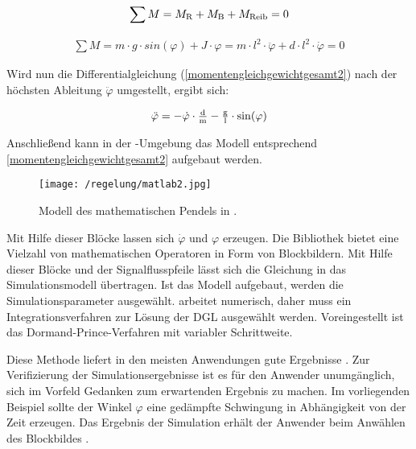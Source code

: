 \begin{align}
	\sum M = M_\i{R} + M_\i{B} + M_\i{Reib} = 0
	\label{momentengleichgewichtgesamt} 
\end{align}

\begin{align}
	\sum M = m \cdot g \cdot \si{sin}(\varphi) + J \cdot \varphi = m \cdot l^{2} \cdot \ddot\varphi + d \cdot l^{2} \cdot \dot\varphi = 0
	\label{momentengleichgewichtgesamt2} 
\end{align}

Wird nun die Differentialgleichung (\ref{momentengleichgewichtgesamt2}) nach der höchsten Ableitung $\ddot\varphi$ umgestellt, ergibt sich:

\begin{align}
	\ddot\varphi = -\dot\varphi \cdot \tfrac{\i{d}}{\i{m}} - \tfrac{\i{g}}{\i{l}} \cdot \si{sin}(\varphi)
	\label{diffgleichung} 
\end{align}


Anschließend kann in der -Umgebung das Modell entsprechend \ref{momentengleichgewichtgesamt2} aufgebaut werden.

\begin{figure}[h]
	\centering
	\texttt{[image: /regelung/matlab2.jpg]}
	\label{fig:matlab2}
	\caption{Modell des mathematischen Pendels in  .}
\end{figure}

Mit Hilfe dieser Blöcke lassen sich  $\dot{\varphi}$ und $\varphi$ erzeugen.
Die  Bibliothek bietet eine Vielzahl von mathematischen Operatoren in Form von Blockbildern.
Mit Hilfe dieser Blöcke und der Signalflusspfeile lässt sich die Gleichung in das Simulationsmodell übertragen.
Ist das Modell aufgebaut, werden die Simulationsparameter ausgewählt. 
 arbeitet numerisch, daher muss ein Integrationsverfahren zur Lösung der DGL ausgewählt werden. Voreingestellt ist das Dormand-Prince-Verfahren mit variabler Schrittweite.

Diese Methode liefert in den meisten Anwendungen gute Ergebnisse \autocite{scherf2010}.
Zur Verifizierung der Simulationsergebnisse ist es für den Anwender unumgänglich, sich im Vorfeld Gedanken zum erwartenden Ergebnis zu machen.
Im vorliegenden Beispiel sollte der Winkel $\varphi$ eine gedämpfte Schwingung in Abhängigkeit von der Zeit erzeugen.
Das Ergebnis der Simulation erhält der Anwender beim Anwählen des Blockbildes \grqq.

